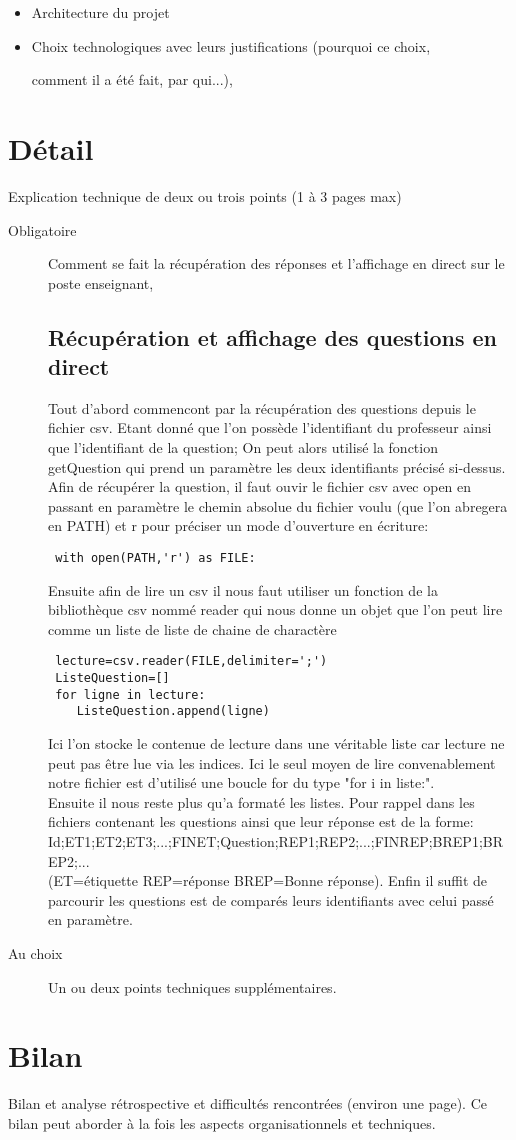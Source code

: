 \documentclass[a4paper, 12pt]{article}
\begin{document}
\begin{itemize}
\item Architecture du projet
\item Choix technologiques  avec leurs justifications (pourquoi ce choix, 

comment il a été fait, par qui...),
\end{itemize}

    
\section{Détail}

Explication technique de deux ou trois points (1 à 3 pages max)
\begin{description}
\item[Obligatoire] Comment se fait la récupération des réponses et l'affichage
en direct sur le poste enseignant,

\subsection{Récupération et affichage des questions en direct}

Tout d'abord commencont par la récupération des questions depuis le fichier 
csv. Etant donné que l'on possède l'identifiant du professeur ainsi que 
l'identifiant de la question; On peut alors utilisé la fonction getQuestion qui
prend un paramètre
les deux identifiants précisé si-dessus. Afin de récupérer la question, il faut
ouvir le fichier csv avec open en passant en paramètre le chemin absolue du
fichier voulu (que l'on abregera en PATH) et r pour préciser un mode d'ouverture
en écriture: 
\begin{lstlisting}
 with open(PATH,'r') as FILE:
\end{lstlisting}
Ensuite afin de lire un csv il nous faut utiliser un fonction de la bibliothèque
csv nommé reader qui nous donne un objet que l'on peut lire comme un liste de 
liste de chaine de charactère
\begin{lstlisting}
 lecture=csv.reader(FILE,delimiter=';')
 ListeQuestion=[]
 for ligne in lecture:
    ListeQuestion.append(ligne)
\end{lstlisting}
Ici l'on stocke le contenue de lecture dans une véritable liste car lecture
ne peut pas être lue via les indices. Ici le seul moyen de lire convenablement
notre fichier est d'utilisé une boucle for du type "for i in liste:". \\
Ensuite il nous reste plus qu'a formaté les listes. Pour rappel dans les 
fichiers contenant les questions ainsi que leur réponse est de la forme:\\
Id;ET1;ET2;ET3;...;FINET;Question;REP1;REP2;...;FINREP;BREP1;BREP2;...\\
(ET=étiquette REP=réponse BREP=Bonne réponse).
Enfin il suffit de parcourir les questions est de comparés leurs identifiants 
avec celui passé en paramètre. 

\item[Au choix] Un ou deux  points techniques supplémentaires.  
\end{description}

\section{Bilan}

Bilan et analyse rétrospective et difficultés rencontrées (environ une page). 
Ce bilan peut aborder à la fois les aspects organisationnels et techniques.

    
\end{document}
